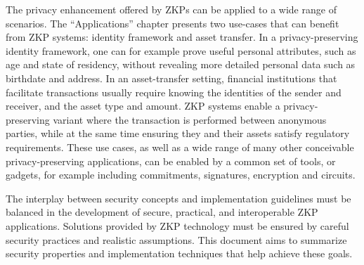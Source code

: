 	The privacy enhancement offered by ZKPs can be applied to a wide range of scenarios.  
	The ``Applications'' chapter presents two use-cases that can benefit from ZKP systems: identity framework and asset transfer. 
	In a privacy-preserving identity framework, one can for example prove useful personal attributes, such as age and state of residency, without revealing more detailed personal data such as birthdate and address.
	In an asset-transfer setting, financial institutions that facilitate transactions usually require knowing the identities of the sender and receiver, and the asset type and amount. 
	ZKP systems enable a privacy-preserving variant where the transaction is performed between anonymous parties, while at the same time ensuring they and their assets satisfy regulatory requirements.
	These use cases, as well as a wide range of many other conceivable privacy-preserving applications, can be enabled by a common set of tools, or gadgets, for example including commitments, signatures, encryption and circuits.
\loosen


	The interplay between security concepts and implementation guidelines must be balanced in %
the development of secure, practical, and interoperable ZKP applications.
	Solutions provided by ZKP technology must be ensured by careful security practices and realistic assumptions.
	This document aims to summarize security properties and implementation techniques that help achieve these goals.
		